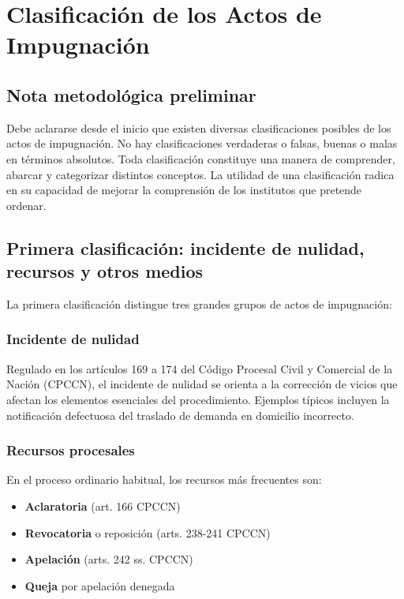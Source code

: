 \documentclass[12pt,oneside]{book}
\begin{document}
\chapter{Clasificación de los Actos de Impugnación}

\section{Nota metodológica preliminar}

Debe aclararse desde el inicio que existen diversas clasificaciones posibles de los actos de impugnación. No hay clasificaciones verdaderas o falsas, buenas o malas en términos absolutos. Toda clasificación constituye una manera de comprender, abarcar y categorizar distintos conceptos. La utilidad de una clasificación radica en su capacidad de mejorar la comprensión de los institutos que pretende ordenar.

\section{Primera clasificación: incidente de nulidad, recursos y otros medios}

La primera clasificación distingue tres grandes grupos de actos de impugnación:

\subsection{Incidente de nulidad}

Regulado en los artículos 169 a 174 del Código Procesal Civil y Comercial de la Nación (CPCCN), el incidente de nulidad se orienta a la corrección de vicios que afectan los elementos esenciales del procedimiento. Ejemplos típicos incluyen la notificación defectuosa del traslado de demanda en domicilio incorrecto.

\subsection{Recursos procesales}

En el proceso ordinario habitual, los recursos más frecuentes son:

\begin{itemize}
    \item \textbf{Aclaratoria} (art. 166 CPCCN)
    \item \textbf{Revocatoria} o reposición (arts. 238-241 CPCCN)
    \item \textbf{Apelación} (arts. 242 ss. CPCCN)
    \item \textbf{Queja} por apelación denegada
\end{itemize}
\end{document}
